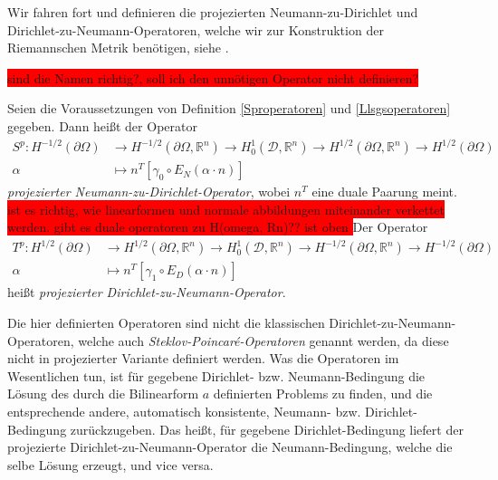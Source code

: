 Wir fahren fort und definieren die projezierten Neumann-zu-Dirichlet und Dirichlet-zu-Neumann-Operatoren, welche wir zur Konstruktion der Riemannschen Metrik benötigen, siehe \cite{bfgs2}.

\colorbox{red}{sind die Namen richtig?, soll ich den unnötigen Operator nicht definieren?}

\begin{defi}\label{Randoperatoren}
Seien die Voraussetzungen von Definition \ref{Sproperatoren} und \ref{Llsgsoperatoren} gegeben. Dann heißt der Operator
\begin{align*}
	S^p: H^{-1/2}(\partial\Omega) &\rightarrow H^{-1/2}(\partial\Omega, \mathbb{R}^n) \rightarrow H^1_0(\mathcal{D},\mathbb{R}^n) \rightarrow H^{1/2}(\partial\Omega, \mathbb{R}^n) \rightarrow H^{1/2}(\partial\Omega) \\
	\alpha &\mapsto n^T[\gamma_0 \circ E_N(\alpha \cdot n)]
\end{align*}
\textit{projezierter Neumann-zu-Dirichlet-Operator}, wobei $n^T$ eine duale Paarung meint.
\colorbox{red}{ist es richtig, wie linearformen und normale abbildungen miteinander verkettet werden. gibt es duale operatoren zu H(omega, Rn)?? ist oben  }
Der Operator
\begin{align*}
	T^p: H^{1/2}(\partial\Omega) &\rightarrow H^{1/2}(\partial\Omega,\mathbb{R}^n) \rightarrow H^1_0(\mathcal{D},\mathbb{R}^n) \rightarrow H^{-1/2}(\partial\Omega,\mathbb{R}^n) \rightarrow H^{-1/2}(\partial\Omega) \\
	\alpha &\mapsto n^T[\gamma_1 \circ E_D(\alpha \cdot n)]
\end{align*}
heißt \textit{projezierter Dirichlet-zu-Neumann-Operator}.
\end{defi}



Die hier definierten Operatoren sind nicht die klassischen Dirichlet-zu-Neumann-Operatoren, welche auch \textit{Steklov-Poincaré-Operatoren} genannt werden, da diese nicht in projezierter Variante definiert werden. Was die Operatoren im Wesentlichen tun, ist für gegebene Dirichlet- bzw. Neumann-Bedingung die Lösung des durch die Bilinearform $a$ definierten Problems zu finden, und die entsprechende andere, automatisch konsistente, Neumann- bzw. Dirichlet-Bedingung zurückzugeben. Das heißt, für gegebene Dirichlet-Bedingung liefert der projezierte Dirichlet-zu-Neumann-Operator die Neumann-Bedingung, welche die selbe Lösung erzeugt, und vice versa.

